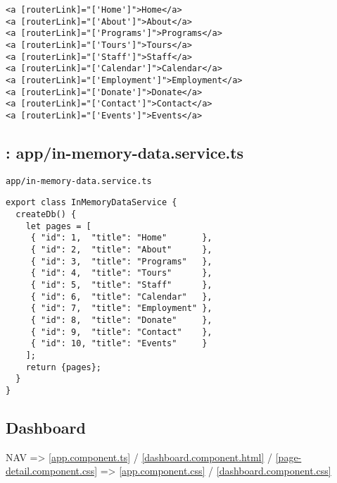 \documentclass[11pt]{article}
\begin{document}
\begin{verbatim}
<a [routerLink]="['Home']">Home</a>
<a [routerLink]="['About']">About</a>
<a [routerLink]="['Programs']">Programs</a>
<a [routerLink]="['Tours']">Tours</a>
<a [routerLink]="['Staff']">Staff</a>
<a [routerLink]="['Calendar']">Calendar</a>
<a [routerLink]="['Employment']">Employment</a>
<a [routerLink]="['Donate']">Donate</a>
<a [routerLink]="['Contact']">Contact</a>
<a [routerLink]="['Events']">Events</a>
\end{verbatim}

\subsection{: app/in-memory-data.service.ts}
\label{sec-2-3}
\begin{verbatim}
app/in-memory-data.service.ts
\end{verbatim}
\begin{verbatim}
export class InMemoryDataService {
  createDb() {
    let pages = [
     { "id": 1,  "title": "Home"       },
     { "id": 2,  "title": "About"      },
     { "id": 3,  "title": "Programs"   },
     { "id": 4,  "title": "Tours"      },
     { "id": 5,  "title": "Staff"      },
     { "id": 6,  "title": "Calendar"   },
     { "id": 7,  "title": "Employment" },
     { "id": 8,  "title": "Donate"     },
     { "id": 9,  "title": "Contact"    },
     { "id": 10, "title": "Events"     }
    ];
    return {pages};
  }
}
\end{verbatim}

\subsection{Dashboard}
\label{sec-2-4}

NAV => \ref{app.component.ts} / \ref{dashboard.component.html} / \ref{page-detail.component.css}
=> \ref{app.component.css} / \ref{dashboard.component.css} 
\end{document}
